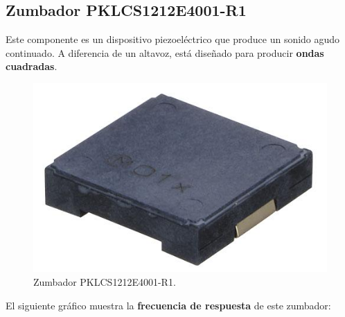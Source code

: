 \smallskip

\subsection{Zumbador PKLCS1212E4001-R1}

Este componente es un dispositivo piezoeléctrico que produce un sonido agudo continuado. A diferencia de un altavoz, está diseñado para producir \textbf{ondas cuadradas}.

\smallskip

\begin{figure}[H]
	\noindent \begin{centering}
		\includegraphics[width=\linewidth/3]{capitulo3/buzzer}
		\par\end{centering}
	\smallskip
	\caption[Zumbador PKLCS1212E4001-R1.]{\label{fig:buzzer} Zumbador PKLCS1212E4001-R1. \cite{buzzer}}
\end{figure} 

\smallskip

El siguiente gráfico muestra la \textbf{frecuencia de respuesta} de este zumbador:

\smallskip

